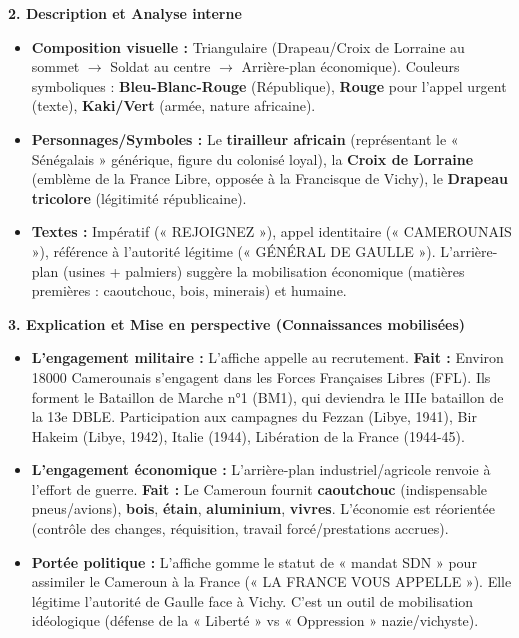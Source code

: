 \documentclass[11pt]{article}
\newcommand{\cle}[1]{{\popxbold\color{popdark}#1}}
\begin{document}
\begin{exoresolu}
\textbf{2. Description et Analyse interne}
\begin{itemize}
    \item \textbf{Composition visuelle :} Triangulaire (Drapeau/Croix de Lorraine au sommet $\rightarrow$ Soldat au centre $\rightarrow$ Arrière-plan économique). Couleurs symboliques : \textbf{Bleu-Blanc-Rouge} (République), \textbf{Rouge} pour l'appel urgent (texte), \textbf{Kaki/Vert} (armée, nature africaine).
    \item \textbf{Personnages/Symboles :} Le \textbf{tirailleur africain} (représentant le « \cle{Sénégalais} » générique, figure du colonisé loyal), la \textbf{Croix de Lorraine} (emblème de la France Libre, opposée à la Francisque de Vichy), le \textbf{Drapeau tricolore} (légitimité républicaine).
    \item \textbf{Textes :} Impératif (« REJOIGNEZ »), appel identitaire (« CAMEROUNAIS »), référence à l'autorité légitime (« GÉNÉRAL DE GAULLE »). L'arrière-plan (usines + palmiers) suggère la \cle{mobilisation économique} (matières premières : caoutchouc, bois, minerais) et humaine.
\end{itemize}

\textbf{3. Explication et Mise en perspective (Connaissances mobilisées)}
\begin{itemize}
    \item \textbf{L'engagement militaire :} L'affiche appelle au recrutement. \textbf{Fait :} Environ \num{18000} Camerounais s'engagent dans les \cle{Forces Françaises Libres (FFL)}. Ils forment le Bataillon de Marche n°1 (BM1), qui deviendra le IIIe bataillon de la \cle{13e DBLE}. Participation aux campagnes du \cle{Fezzan} (Libye, 1941), \cle{Bir Hakeim} (Libye, 1942), Italie (1944), Libération de la France (1944-45).
    \item \textbf{L'engagement économique :} L'arrière-plan industriel/agricole renvoie à l'effort de guerre. \textbf{Fait :} Le Cameroun fournit \textbf{caoutchouc} (indispensable pneus/avions), \textbf{bois}, \textbf{étain}, \textbf{aluminium}, \textbf{vivres}. L'économie est réorientée (contrôle des changes, réquisition, travail forcé/\cle{prestations} accrues).
    \item \textbf{Portée politique :} L'affiche gomme le statut de « mandat SDN » pour assimiler le Cameroun à la France (« LA FRANCE VOUS APPELLE »). Elle légitime l'autorité de Gaulle face à Vichy. C'est un outil de \cle{mobilisation idéologique} (défense de la « Liberté » vs « Oppression » nazie/vichyste).
\end{itemize}


\end{exoresolu}
\end{document}
